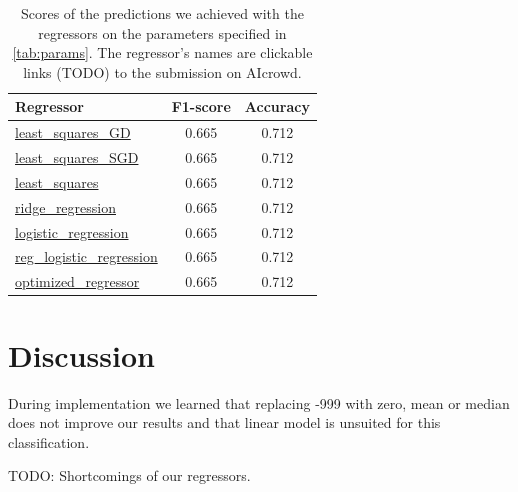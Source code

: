 \documentclass[11pt, a4paper, twocolumn]{article}
\begin{document}
\begin{table}[ht]
    \caption{Scores of the predictions we achieved with the regressors on 
             the parameters specified in \ref{tab:params}. The regressor's
             names are clickable links ({\color{red}TODO}) to the submission on AIcrowd.}
    \label{tab:results}
    \centering
    \renewcommand{\arraystretch}{1.2}
    \begin{tabular}{@{}lcc@{}}
        \toprule
        Regressor & F1-score & Accuracy \\
        \midrule
        \href{https://www.aicrowd.com/challenges/epfl-machine-learning-higgs/submissions/159686}{least\_squares\_GD} & 0.665 & 0.712 \\
        \href{https://www.aicrowd.com/challenges/epfl-machine-learning-higgs/submissions/159686}{least\_squares\_SGD} & 0.665 & 0.712 \\
        \href{https://www.aicrowd.com/challenges/epfl-machine-learning-higgs/submissions/159686}{least\_squares} & 0.665 & 0.712 \\
        \href{https://www.aicrowd.com/challenges/epfl-machine-learning-higgs/submissions/159686}{ridge\_regression} & 0.665 & 0.712 \\
        \href{https://www.aicrowd.com/challenges/epfl-machine-learning-higgs/submissions/159686}{logistic\_regression} & 0.665 & 0.712 \\
        \href{https://www.aicrowd.com/challenges/epfl-machine-learning-higgs/submissions/159686}{reg\_logistic\_regression} & 0.665 & 0.712 \\
        \href{https://www.aicrowd.com/challenges/epfl-machine-learning-higgs/submissions/159686}{optimized\_regressor} & 0.665 & 0.712 \\
        \bottomrule
    \end{tabular}
\end{table}

\section{Discussion}
\label{sec:discussion}
During implementation we learned that replacing -999 with zero, mean or median does not improve our results and that linear model is unsuited for this classification.

{\color{red}TODO}: Shortcomings of our regressors.


\end{document}

